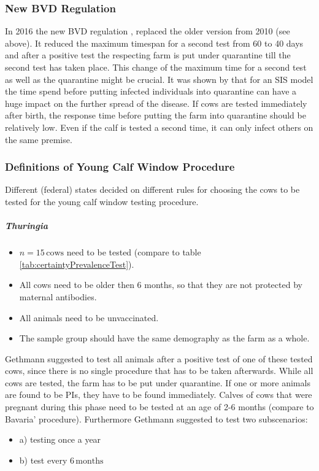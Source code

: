 \subsubsection{New BVD Regulation}
In 2016 the new BVD regulation \citep{bvdverordnungaenderung},\citep{bvdvonew} replaced the older version from 2010 (see above). It reduced the maximum timespan for a second test from 60 to 40 days and after a positive test the respecting farm is put under quarantine till the second test has taken place. This change of the maximum time for a second test as well as the quarantine might be crucial. It was shown by \citep{pereira2015control} that for an SIS model the time spend before putting infected individuals into quarantine can have a huge impact on the further spread of the disease. If cows are tested immediately after birth, the response time before putting the farm into quarantine should be relatively low. Even if the calf is tested a second time, it can only infect others on the same premise.
\subsubsection{Definitions of Young Calf Window Procedure}\label{chap:ycwdef}
Different (federal) states decided on different rules for choosing the cows to be tested for the young calf window testing procedure. 
\subparagraph{Thuringia}\label{chap:stratThuringia}
\begin{itemize}
\item $n = 15\,\text{cows}$ need to be tested (compare to table \ref{tab:certaintyPrevalenceTest}).
\item All cows need to be older then 6 months, so that they are not protected by maternal antibodies.
\item All animals need to be unvaccinated.
\item The sample group should have the same demography as the farm as a whole.
\end{itemize}
Gethmann suggested to test all animals after a positive test of one of these tested cows, since there is no single procedure that has to be taken afterwards. While all cows are tested, the farm has to be put under quarantine. If one or more animals are found to be PIs, they have to be found immediately. Calves of cows that were pregnant during this phase need to be tested at an age of 2-6 months (compare to Bavaria' procedure). Furthermore Gethmann suggested to test two subscenarios:
\begin{itemize}
\item a) testing once a year
\item b) test every $6\,\text{months}$
\end{itemize}

